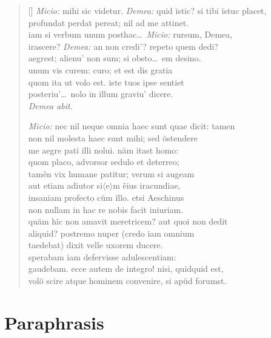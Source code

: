 \begin{verse}[\versewidth]
    \textit{Micio:} mihi sic videtur. \textit{Demea:} quid ĭstic? si tibi ĭstuc placet,\\
    profundat perdat pereat; nil ad me attinet.\\
    iam si verbum unum posthac\dots\ \textit{Micio:} rursum, Demea,\\
    irascere? \textit{Demea:} an non credi'? repeto quem dedi?\\
    aegrest; alienu' non sum; si obsto\dots\ em desino.\\
    unum vis curem: curo; et est dis gratia\\
    quom ita ut volo est. iste tuos ipse sentiet\\
    posteriu'\dots\ nolo in illum graviu' dicere.\\

    \textit{Demea abit.}

    \textit{Micio:} nec nil neque omnia haec sunt quae dicit: tamen\\
    non nil molesta haec sunt mihi; sed ŏstendere\\
    me aegre pati illi nolui. năm itast homo:\\
    quom placo, advorsor sedulo et deterreo;\\
    taměn vix humane patitur; verum si augeam\\
    aut etiam adiutor si$\langle$e$\rangle$m ěius iracundiae,\\
    insaniam profecto cŭm ĭllo. etsi Aeschinus\\
    non nullam in hac re nobis facit iniuriam.\\
    quăm hĭc non amavit meretricem? aut quoi non dedit\\
    aliquid? postremo nuper (credo iam omnium\\
    taedebat) dixit velle uxorem ducere.\\
    sperabam iam defervisse adulescentiam:\\
    gaudebam. ecce autem de integro! nisi, quidquid est,\\
    volŏ scire atque hominem convenire, si apŭd forumst.\\
\end{verse}


\section*{Paraphrasis}

